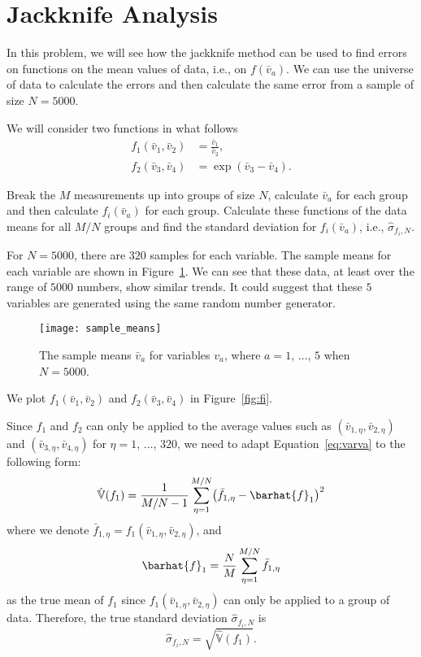 \section{Jackknife Analysis}\label{sec:ja}

In this problem, we will see how the jackknife method can be used to find errors on functions
on the mean values of data, i.e., on \(f(\bar{v}_a)\).
We can use the universe of data to calculate
the errors and then calculate the same error from a sample of size \(N = 5000\).

We will consider two functions in what follows
%
\begin{align}
    f_1(\bar{v}_1, \bar{v}_2) & = \frac{ \bar{v}_1 }{ \bar{v}_2 }, \\
    f_2(\bar{v}_3, \bar{v}_4) & = \exp( \bar{v}_3 - \bar{v}_4 ).
\end{align}

 Break the \(M\) measurements up into groups of size \(N\), calculate
\(\bar{v}_a\) for each group and then calculate \(f_i(\bar{v}_a)\) for each group.
Calculate these functions of the data means for all \(M/N\) groups and find the
standard deviation for \(f_i(\bar{v}_a)\), i.e., \(\hat{\sigma}_{f_i,N}\).

\Answer{}
For \(N = 5000\), there are \(320\) samples for each variable.
The sample means for each variable are shown in Figure~\ref{fig:sample_means}.
We can see that these data, at least over the range of \(5000\) numbers,
show similar trends.
It could suggest that these \(5\) variables are generated using the same random
number generator.

\begin{figure}[h]
    \centering
    \texttt{[image: sample\_means]}
    \caption{The sample means \(\bar{v}_a\) for variables \(v_a\), where
        \(a = 1\), \(\ldots\), \(5\) when \(N = 5000\).}
    \label{fig:sample_means}
\end{figure}

We plot \(f_1(\bar{v}_1, \bar{v}_2)\) and \(f_2(\bar{v}_3, \bar{v}_4)\) in
Figure~\ref{fig:fi}.

Since \(f_1\) and \(f_2\) can only be applied to the average values such as
\((\bar{v}_{1,\eta}, \bar{v}_{2,\eta})\) and \((\bar{v}_{3,\eta}, \bar{v}_{4,\eta})\)
for \(\eta = 1\), \(\ldots\), \(320\), we need to adapt Equation~\eqref{eq:varva}
to the following form:
%
\begin{equation}
    \hat{\mathbb{V}}(f_1) = \frac{ 1 }{ M / N - 1 }
    \sum_{\eta=1}^{M/N} \bigl( \bar{f}_{1,\eta} - \barhat{f}_1 \bigr)^2
\end{equation}
%
where we denote \(\bar{f}_{1,\eta} = f_1(\bar{v}_{1,\eta}, \bar{v}_{2,\eta})\),
and
%
\begin{equation}
    \barhat{f}_1 = \frac{ N }{ M } \sum_{\eta=1}^{M/N} \bar{f}_{1,\eta}
\end{equation}
as the true mean of \(f_1\)
since \(f_1(\bar{v}_{1,\eta}, \bar{v}_{2,\eta})\) can only be applied to a group of data.
Therefore, the true standard deviation \(\hat{\sigma}_{f_i,N}\) is
%
\begin{equation}
    \hat{\sigma}_{f_i,N} = \sqrt{\hat{\mathbb{V}}(f_1)}.
\end{equation}

